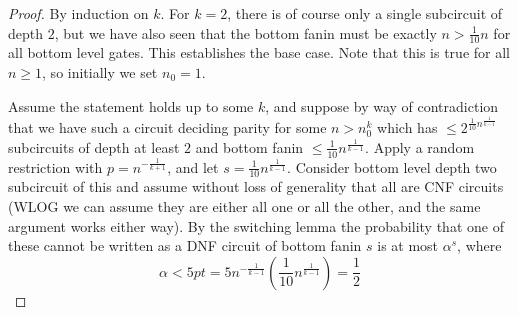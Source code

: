 \documentclass{article}
\theoremstyle{definition}
\theoremstyle{plain}
\theoremstyle{theorem}
\begin{document}
\begin{proof}
	By induction on $k$. For $k=2$, there is of course only a single subcircuit of depth $2$, but we have also seen that the bottom fanin must be exactly $n > \frac{1}{10}n$ for all bottom level gates. This establishes the base case. Note that this is true for all $n \geq 1$, so initially we set $n_0 = 1$.  \par 
  Assume the statement holds up to some $k$, and suppose by way of contradiction that we have such a circuit deciding parity for some $n > n_0^k$ which has $\leq 2^{\frac{1}{10}n^{\frac{1}{k-1}}}$ subcircuits of depth at least $2$ and bottom fanin $\leq \frac{1}{10}n^{\frac{1}{k-1}}$. Apply a random restriction with $p = n^{-\frac{1}{k+1}}$, and let $s = \frac{1}{10}n^{\frac{1}{k-1}}$. Consider bottom level depth two subcircuit of this and assume without loss of generality that all are CNF circuits (WLOG we can assume they are either all one or all the other, and the same argument works either way). By the switching lemma the probability that one of these cannot be written as a DNF circuit of bottom fanin $s$ is at most $\alpha^s$, where 
  \[ \alpha < 5pt = 5n^{-\frac{1}{k-1}}(\frac{1}{10}n^{\frac{1}{k-1}}) = \frac{1}{2} \]


\end{proof}
\end{document}
